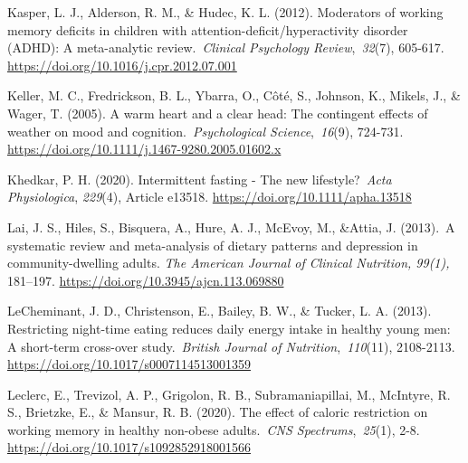 \documentclass[authordate, empirical,issue]{jote-new-article}
\begin{document}
Kasper, L. J., Alderson, R. M., \& Hudec, K. L. (2012). Moderators of working memory deficits in children with attention-deficit/hyperactivity disorder (ADHD): A meta-analytic review. \emph{Clinical Psychology Review}, \emph{32}(7), 605-617. \url{https://doi.org/10.1016/j.cpr.2012.07.001}



Keller, M. C., Fredrickson, B. L., Ybarra, O., Côté, S., Johnson, K., Mikels, J., \& Wager, T. (2005). A warm heart and a clear head: The contingent effects of weather on mood and cognition. \emph{Psychological Science}, \emph{16}(9), 724-731. \url{https://doi.org/10.1111/j.1467-9280.2005.01602.x}



Khedkar, P. H. (2020). Intermittent fasting - The new lifestyle? \emph{Acta Physiologica}, \emph{229}(4), Article e13518. \url{https://doi.org/10.1111/apha.13518}






Lai, J. S., Hiles, S., Bisquera, A., Hure, A. J., McEvoy, M., \&Attia, J. (2013). A systematic review and meta-analysis of dietary patterns and depression in community-dwelling adults.\emph{ The American Journal of Clinical Nutrition, 99(1), }181--197. \url{https://doi.org/10.3945/ajcn.113.069880}






LeCheminant, J. D., Christenson, E., Bailey, B. W., \& Tucker, L. A. (2013). Restricting night-time eating reduces daily energy intake in healthy young men: A short-term cross-over study. \emph{British Journal of Nutrition}, \emph{110}(11), 2108-2113. \url{https://doi.org/10.1017/s0007114513001359}



Leclerc, E., Trevizol, A. P., Grigolon, R. B., Subramaniapillai, M., McIntyre, R. S., Brietzke, E., \& Mansur, R. B. (2020). The effect of caloric restriction on working memory in healthy non-obese adults. \emph{CNS Spectrums}, \emph{25}(1), 2-8. \url{https://doi.org/10.1017/s1092852918001566}
\end{document}
